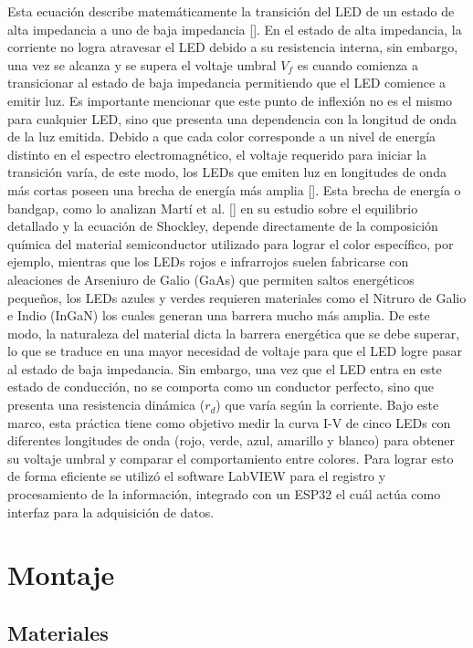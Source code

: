 \documentclass[conference,10pt,letterpaper]{IEEEtran}
\begin{document}
Esta ecuación describe matemáticamente la transición del LED de un estado de alta impedancia a uno de baja impedancia [\cite{1}]. En el estado de alta impedancia, la corriente no logra atravesar el LED debido a su resistencia interna, sin embargo, una vez se alcanza y se supera el voltaje umbral $V_f$ es cuando comienza a transicionar al estado de baja impedancia permitiendo que el LED comience a emitir luz. Es importante mencionar que este punto de inflexión no es el mismo para cualquier LED, sino que presenta una dependencia con la longitud de onda de la luz emitida.  Debido a que cada color corresponde a un nivel de energía distinto en el espectro electromagnético, el voltaje requerido para iniciar la transición varía, de este modo, los LEDs que emiten luz en longitudes de onda más cortas poseen una brecha de energía más amplia [\cite{2}]. Esta brecha de energía o bandgap, como lo analizan Martí et al. [\cite{3}] en su estudio sobre el equilibrio detallado y la ecuación de Shockley, depende directamente de la composición química del material semiconductor utilizado para lograr el color específico, por ejemplo, mientras que los LEDs rojos e infrarrojos suelen fabricarse con aleaciones de Arseniuro de Galio (GaAs) que permiten saltos energéticos pequeños, los LEDs azules y verdes requieren materiales como el Nitruro de Galio e Indio (InGaN) los cuales generan una barrera mucho más amplia. De este modo, la naturaleza del material dicta la barrera energética que se debe superar, lo que se traduce en una mayor necesidad de voltaje para que el LED logre pasar al estado de baja impedancia. Sin embargo, una vez que el LED entra en este estado de conducción, no se comporta como un conductor perfecto, sino que presenta una resistencia dinámica ($r_d$) que varía según la corriente. Bajo este marco, esta práctica tiene como objetivo medir la curva I-V de cinco LEDs con diferentes longitudes de onda (rojo, verde, azul, amarillo y blanco) para obtener su voltaje umbral y comparar el comportamiento entre colores. Para lograr esto de forma eficiente se utilizó el software LabVIEW para el registro y procesamiento de la información, integrado con un ESP32 el cuál actúa como interfaz para la adquisición de datos. 

\section{Montaje}

\subsection{Materiales}
\end{document}
